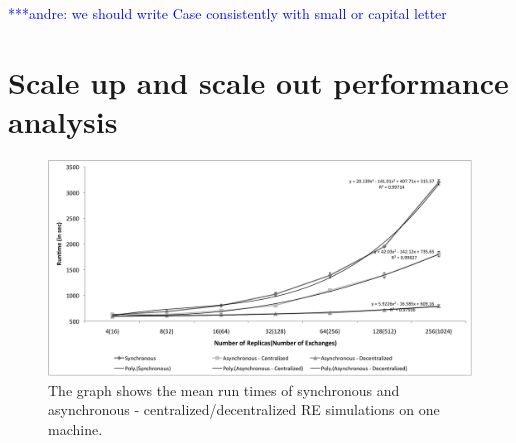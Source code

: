\documentclass[a4paper,10pt]{article}
\newcommand{\jhanote}[1]{ {\textcolor{red} { ***shantenu: #1 }}}
\newcommand{\alnote}[1]{ {\textcolor{blue} { ***andre: #1 }}}
\newcommand{\alnote}[1]{}
\newcommand{\jhanote}[1]{}
\begin{document}
\alnote{we should write Case consistently with small or capital letter}


\section{Scale up and scale out performance analysis}
%
\begin{figure}
\centering
\includegraphics[scale=0.50]{data/scale_up.pdf}
\caption{\small The graph shows the mean run times of synchronous and asynchronous - centralized/decentralized RE simulations on one machine.}
\label{fig:graph}
\vspace{-1em}
\end{figure}


\end{document}
